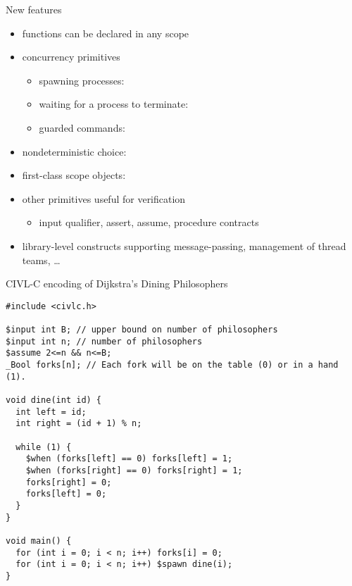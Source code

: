 \documentclass[t]{beamer}
\begin{document}
\begin{frame}{New features}
  \begin{itemize}
  \item functions can be declared in any scope
  \item concurrency primitives
    \begin{itemize}
    \item spawning processes: 
    \item waiting for a process to terminate: 
    \item guarded commands: 
    \end{itemize}
  \item nondeterministic choice: 
  \item first-class scope objects: 
  \item other primitives useful for verification
    \begin{itemize}
    \item input qualifier, assert, assume, procedure contracts
    \end{itemize}
  \item library-level constructs supporting message-passing,
    management of thread teams, \ldots
  \end{itemize}
\end{frame}

\begin{frame}[containsverbatim]{CIVL-C encoding of Dijkstra's Dining Philosophers}
  \begin{scriptsize}
\begin{verbatim}
#include <civlc.h>

$input int B; // upper bound on number of philosophers
$input int n; // number of philosophers
$assume 2<=n && n<=B;
_Bool forks[n]; // Each fork will be on the table (0) or in a hand (1). 

void dine(int id) {
  int left = id;
  int right = (id + 1) % n;

  while (1) {
    $when (forks[left] == 0) forks[left] = 1;
    $when (forks[right] == 0) forks[right] = 1;
    forks[right] = 0;
    forks[left] = 0;
  }
}

void main() {
  for (int i = 0; i < n; i++) forks[i] = 0;
  for (int i = 0; i < n; i++) $spawn dine(i);
}
\end{verbatim}
  \end{scriptsize}
\end{frame}
\end{document}
